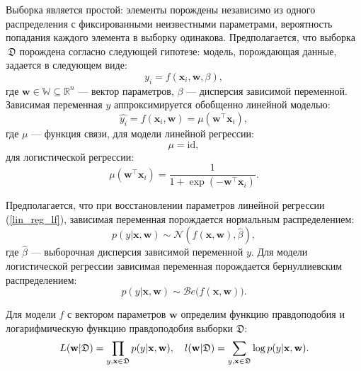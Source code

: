 \documentclass[12pt, a4paper]{scrartcl}
\theoremstyle{plain}
\theoremstyle{definition}
\begin{document}
Выборка является простой: элементы порождены независимо из одного распределения с фиксированными неизвестными параметрами, вероятность попадания каждого элемента в выборку одинакова. Предполагается, что выборка $~\mathfrak D$ порождена согласно следующей гипотезе: модель, порождающая данные, задается в следующем виде:
\begin{equation}\label{f}
y_i = f(\mathbf{x}_i, \mathbf{w}, \beta),
\end{equation}
где $\textbf{w} \in \mathbb{W} \subseteq \mathbb{R}^n$ --- вектор параметров, $\beta$ --- дисперсия зависимой переменной. Зависимая переменная $y$ аппроксимируется обобщенно линейной моделью:
\begin{equation}\label{y_f}
\hat{y_i} = f(\mathbf{x}_i, \mathbf{w}) = \mu(\mathbf{w}^{\top}\mathbf{x}_i),
\end{equation}
где $\mu$ --- функция связи, для модели линейной регрессии:
\begin{equation}\label{lin_reg_lf}
 \mu = \text{id},
\end{equation}
для логистической регрессии:
\begin{equation}\label{log_reg_lf}
\mu(\mathbf{w}^{\top}\mathbf{x}_i) = \frac{1}{1 + \exp(-\mathbf{w}^{\top}\mathbf{x}_i)}.
\end{equation}

Предполагается, что при восстановлении параметров линейной регрессии (\ref{lin_reg_lf}), зависимая переменная порождается нормальным распределением:
$$
p(y | \mathbf{x}, \mathbf{w}) \sim \mathcal{N}(f(\mathbf{x}, \mathbf{w}), \hat{\beta}),
$$
где $\hat{\beta}$ --- выборочная дисперсия зависимой переменной $y$. Для модели логистической регрессии зависимая переменная порождается бернуллиевским распределением:
$$
p(y | \mathbf{x}, \mathbf{w}) \sim \mathcal{B}e \bigl( f(\mathbf{x}, \mathbf{w})\bigr).
$$


Для модели $f$ с вектором параметров $\textbf{w}$ определим функцию правдоподобия и логарифмическую функцию правдоподобия выборки $\mathfrak D$:
\begin{equation}\label{L_l}
L(\textbf{w} | \mathfrak D) = \prod_{y, \textbf{x} \in \mathfrak D} p(y | \textbf{x}, \textbf{w}),~~~ l(\textbf w | \mathfrak D) = \sum_{y, \textbf{x} \in \mathfrak D}\log p(y | \textbf{x}, \textbf{w}).
\end{equation}
\end{document}

